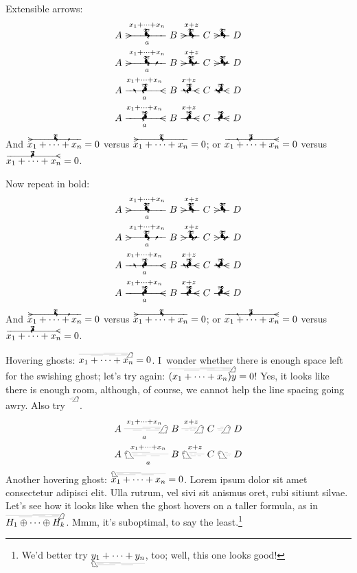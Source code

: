 \documentclass[a4paper]{article}
\newcommand*{\sumxn}{x_{1}+\dots+x_{n}}
\begin{document}
\bigbreak

Extensible arrows:
\begin{gather*}
	A \xrightwitchonbroom[a]{\sumxn} B \xrightwitchonbroom{x+z}
		C \xrightwitchonbroom{} D  \\
	A \xrightwitchonbroom*[a]{\sumxn} B \xrightwitchonbroom*{x+z}
		C \xrightwitchonbroom*{} D  \\
	A \xleftwitchonbroom*[a]{\sumxn} B \xleftwitchonbroom*{x+z}
		C \xleftwitchonbroom*{} D  \\
	A \xleftwitchonbroom[a]{\sumxn} B \xleftwitchonbroom{x+z}
		C \xleftwitchonbroom{} D
\end{gather*}
And \( \overrightwitchonbroom*{\sumxn}=0 \) versus \(
\overrightwitchonbroom{\sumxn}=0 \); or \( \overleftwitchonbroom*{\sumxn}=0 \)
versus \( \overleftwitchonbroom{\sumxn}=0 \).

\begingroup

\bfseries {}

Now repeat in bold:
\begin{gather*}
	A \xrightwitchonbroom[a]{\sumxn} B \xrightwitchonbroom{x+z}
		C \xrightwitchonbroom{} D  \\
	A \xrightwitchonbroom*[a]{\sumxn} B \xrightwitchonbroom*{x+z}
		C \xrightwitchonbroom*{} D  \\
	A \xleftwitchonbroom*[a]{\sumxn} B \xleftwitchonbroom*{x+z}
		C \xleftwitchonbroom*{} D  \\
	A \xleftwitchonbroom[a]{\sumxn} B \xleftwitchonbroom{x+z}
		C \xleftwitchonbroom{} D
\end{gather*}
And \( \overrightwitchonbroom*{\sumxn}=0 \) versus \(
\overrightwitchonbroom{\sumxn}=0 \); or \( \overleftwitchonbroom*{\sumxn}=0 \)
versus \( \overleftwitchonbroom{\sumxn}=0 \).

\endgroup

Hovering ghosts: \( \overrightswishingghost{\sumxn}=0 \).  I~wonder whether
there is enough space left for the swishing ghost; let's try again:
\( \overrightswishingghost{(\sumxn)y}=0 \)!  Yes, it looks like there is enough
room, although, of course, we cannot help the line spacing going awry.  Also try
\( \overrightswishingghost{\mathstrut} \).
\begin{gather*}
	A \xrightswishingghost[a]{\sumxn} B \xrightswishingghost{x+z} C
		\xrightswishingghost{} D  \\
	A \xleftswishingghost[a]{\sumxn} B \xleftswishingghost{x+z} C
		\xleftswishingghost{} D
\end{gather*}
Another hovering ghost: \( \overleftswishingghost{\sumxn}=0 \).
Lorem ipsum dolor sit amet consectetur adipisci elit.  Ulla rutrum, vel sivi sit
anismus oret, rubi sitiunt silvae.  Let's see how it looks like when the ghost
hovers on a taller formula, as in \(
\overrightswishingghost{H_{1}\oplus\dots\oplus H_{k}} \).  Mmm, it's suboptimal,
to say the least.\footnote{We'd better try \(
\underleftswishingghost{y_{1}+\dots+y_{n}} \), too; well, this one looks good!}
\end{document}
